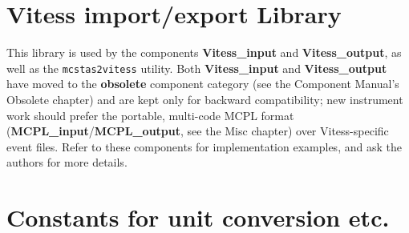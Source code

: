 \section{Vitess import/export Library}

This library is used by the components
\textbf{Vitess\_input} and \textbf{Vitess\_output},
as well as the \verb+mcstas2vitess+ utility.
Both \textbf{Vitess\_input} and \textbf{Vitess\_output} have moved to the \textbf{obsolete}
component category (see the Component Manual's Obsolete chapter) and are kept only for
backward compatibility; new instrument work should prefer the portable, multi-code
MCPL format (\textbf{MCPL\_input}/\textbf{MCPL\_output}, see the Misc chapter) over
Vitess-specific event files.
Refer to these components for implementation examples, and ask the authors for more details.

\section{Constants for unit conversion etc.}

